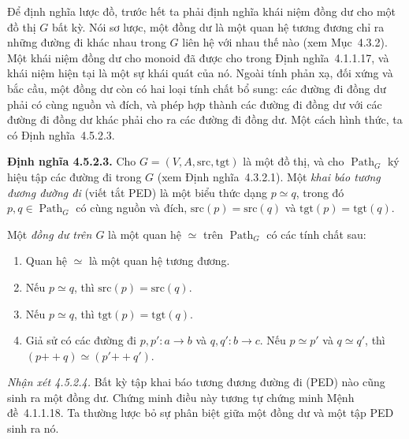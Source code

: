 Để định nghĩa lược đồ, trước hết ta phải định nghĩa khái niệm đồng dư cho một đồ thị $G$ bất kỳ. Nói sơ lược, một đồng dư là một quan hệ tương đương chỉ ra những đường đi khác nhau trong $G$ liên hệ với nhau thế nào (xem Mục~4.3.2). Một khái niệm đồng dư cho monoid
đã được cho trong Định nghĩa~4.1.1.17, và khái niệm hiện tại là một sự khái quát của nó. Ngoài tính phản xạ, đối xứng và bắc cầu, một đồng dư còn có hai loại tính chất bổ sung: các đường đi đồng dư phải có cùng nguồn và đích, và phép hợp thành các đường đi đồng dư với các đường đi đồng dư khác phải cho ra các đường đi đồng dư. Một cách hình thức, ta có Định nghĩa~4.5.2.3.

\noindent\textbf{Định nghĩa 4.5.2.3.}\keepwithnext
Cho $G=(V,A,\mathrm{src},\mathrm{tgt})$ là một đồ thị, và cho $\operatorname{Path}_G$ ký hiệu tập các đường đi trong $G$ (xem Định nghĩa~4.3.2.1). Một \emph{khai báo tương đương đường đi} (viết tắt PED) là một biểu thức dạng $p\simeq q$, trong đó $p,q\in\operatorname{Path}_G$ có cùng nguồn và đích, $\mathrm{src}(p)=\mathrm{src}(q)$ và $\mathrm{tgt}(p)=\mathrm{tgt}(q)$.

Một \emph{đồng dư trên $G$} là một quan hệ $\simeq$ trên $\operatorname{Path}_G$ có các tính chất sau:
\begin{enumerate}
\item Quan hệ $\simeq$ là một quan hệ tương đương.
\item Nếu $p\simeq q$, thì $\mathrm{src}(p)=\mathrm{src}(q)$.
\item Nếu $p\simeq q$, thì $\mathrm{tgt}(p)=\mathrm{tgt}(q)$.
\item Giả sử có các đường đi $p,p':a\to b$ và $q,q':b\to c$. Nếu $p\simeq p'$ và $q\simeq q'$, thì $(p\mathbin{+\!+}q)\simeq(p'\mathbin{+\!+}q')$.
\end{enumerate}

\noindent\textit{Nhận xét 4.5.2.4.}\keepwithnext
Bất kỳ tập khai báo tương đương đường đi (PED) nào cũng sinh ra một đồng dư. Chứng minh điều này tương tự chứng minh Mệnh đề~4.1.1.18. Ta thường lược bỏ sự phân biệt giữa một đồng dư và một tập PED sinh ra nó.

